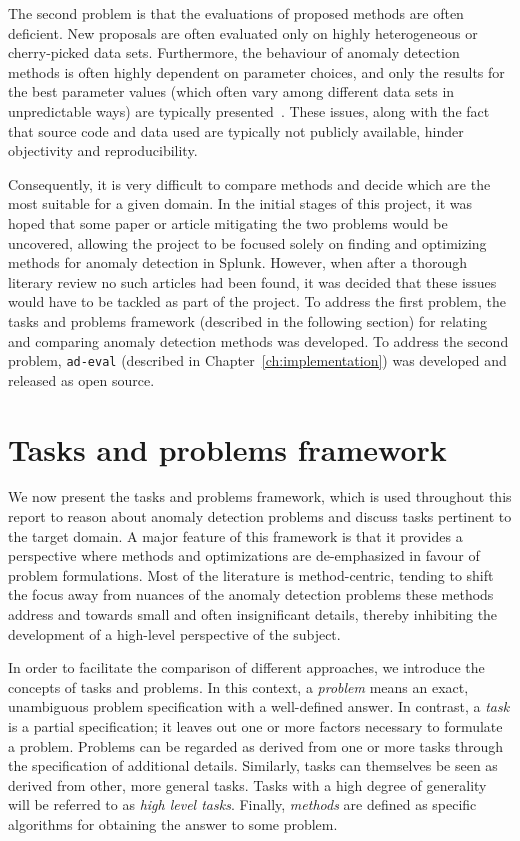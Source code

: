 The second problem is that the evaluations of proposed methods are often deficient. New proposals are often evaluated only on highly heterogeneous or cherry-picked data sets. Furthermore, the behaviour of anomaly detection methods is often highly dependent on parameter choices, and only the results for the best parameter values (which often vary among different data sets in unpredictable ways) are typically presented~\cite{keogh5}. These issues, along with the fact that source code and data used are typically not publicly available, hinder objectivity and reproducibility.

Consequently, it is very difficult to compare methods and decide which are the most suitable for a given domain. In the initial stages of this project, it was hoped that some paper or article mitigating the two problems would be uncovered, allowing the project to be focused solely on finding and optimizing methods for anomaly detection in Splunk. However, when after a thorough literary review no such articles had been found, it was decided that these issues would have to be tackled as part of the project. To address the first problem, the tasks and problems framework (described in the following section) for relating and comparing anomaly detection methods was developed. To address the second problem, \texttt{ad-eval} (described in Chapter~\ref{ch:implementation}) was developed and released as open source.

\section{Tasks and problems framework}
\label{sect:tasks_problems}

We now present the tasks and problems framework, which is used throughout this report to reason about anomaly detection problems and discuss tasks pertinent to the target domain. A major feature of this framework is that it provides a perspective where methods and optimizations are de-emphasized in favour of problem formulations. Most of the literature is method-centric, tending to shift the focus away from nuances of the anomaly detection problems these methods address and towards small and often insignificant details, thereby inhibiting the development of a high-level perspective of the subject.

In order to facilitate the comparison of different approaches, we introduce the concepts of tasks and problems. In this context, a \emph{problem} means an exact, unambiguous problem specification with a well-defined answer. In contrast, a \emph{task} is a partial specification; it leaves out one or more factors necessary to formulate a problem. Problems can be regarded as derived from one or more tasks through the specification of additional details. Similarly, tasks can themselves be seen as derived from other, more general tasks. Tasks with a high degree of generality will be referred to as \emph{high level tasks}. Finally, \emph{methods} are defined as specific algorithms for obtaining the answer to some problem.

